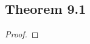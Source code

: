 \documentclass[../../main.tex]{subfiles}
\begin{document}
\subsection{Theorem 9.1}
\begin{wts}

\end{wts}
\begin{proof}

\end{proof}
\end{document}
